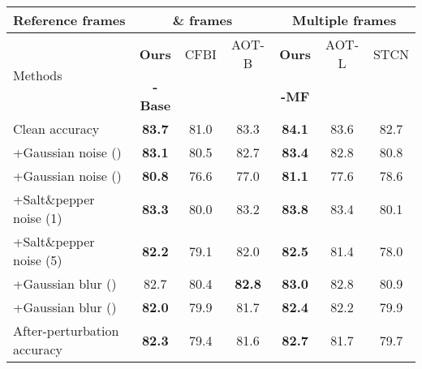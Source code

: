 \documentclass[sigconf]{acmart}
\begin{document}
\renewcommand{\arraystretch}{1}
\begin{table}[t]
	\resizebox{0.48\textwidth}{!}
	{
\begin{tabular}{@{}l|ccc|ccc@{}}
\toprule Reference frames   & \multicolumn{3}{c|}{\& frames}   & \multicolumn{3}{c}{Multiple frames}     \\ \midrule
             
         \multirow{2}{1in}{Methods}    & \multicolumn{1}{c}{\textbf{Ours}} & {CFBI} & {AOT-B}    & {\textbf{Ours}}  & {AOT-L}    & {STCN}     \\
& \multicolumn{1}{c}{\textbf{-Base}} & {\cite{yang2020collaborative}} & {\cite{yang2021associating}}    & {\textbf{-MF}}  & {\cite{yang2021associating}}    & {\cite{cheng2021rethinking}}     \\
             \cmidrule{1-7}
Clean accuracy        & \textbf{83.7}      & 81.0                   & 83.3                     & \textbf{84.1}               & 83.6                     & 82.7                       \\ \midrule  \midrule
 +Gaussian noise ()     &    \textbf{83.1}  & 80.5       & 82.7                       &     \textbf{83.4}             &   82.8                         &      80.8                  \\
+Gaussian noise () & \textbf{80.8}  &    76.6   
           &   77.0     & \textbf{81.1}                       &   77.6                       &   78.6                                               \\ 
+Salt\&pepper noise (1)   &   \textbf{83.3}               & 80.0       & 83.2                  &          \textbf{83.8}                   &   83.4                         &    80.1                      \\
+Salt\&pepper noise (5)  & \textbf{82.2}           & 79.1                          &  82.0                          &   \textbf{82.5}                    & 81.4                     &  78.0                          \\
+Gaussian blur ()   & {82.7} 
             & 80.4      &  \textbf{82.8}  & \textbf{83.0}     & 82.8                        & 80.9                          \\
+Gaussian blur ()    & \textbf{82.0}    & 79.9                           &  81.7                     &   \textbf{82.4}                          &  82.2                          & 79.9                        \\\midrule
After-perturbation accuracy     & \textbf{82.3}  	
             & 79.4     & 81.6     & \textbf{82.7}    & 81.7                       & 79.7                       \\ \midrule\midrule

\end{tabular}}
\end{table}
\end{document}
